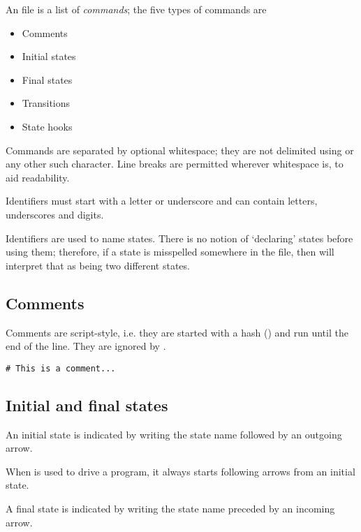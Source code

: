 \documentclass[11pt,a4paper]{article}
\begin{document}
An  file is a list of \emph{commands}; the five types of
commands are

\begin{itemize}

  \item Comments
  \item Initial states
  \item Final states
  \item Transitions
  \item State hooks

\end{itemize}

Commands are separated by optional whitespace; they are not delimited
using \il{;} or any other such character. Line breaks are permitted
wherever whitespace is, to aid readability.

Identifiers must start with a letter or underscore and can contain
letters, underscores and digits.

Identifiers are used to name states. There is no notion of `declaring'
states before using them; therefore, if a state is misspelled
somewhere in the  file, then  will interpret that
as being two different states.

\subsection{Comments}

Comments are script-style, i.e. they are started with a hash (\il{#})
and run until the end of the line. They are ignored by .

\begin{lstlisting}
# This is a comment...
\end{lstlisting}

\subsection{Initial and final states}

An initial state is indicated by writing the state name followed by an
outgoing arrow.


When  is used to drive a program, it always starts
following arrows from an initial state.

A final state is indicated by writing the state name preceded by an
incoming arrow.

\end{document}
